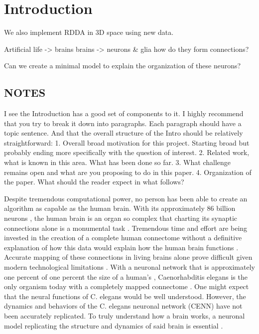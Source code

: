 \section{Introduction}

We also implement RDDA in 3D space using new data.

Artificial life -> brains
brains -> neurons \& glia 
how do they form connections?

Can we create a minimal model to explain the organization of these neurons?


\subsection{NOTES}
I see the Introduction has a good set of components to it. I highly recommend that you try to break it down into paragraphs. Each paragraph should have a topic sentence. And that the overall structure of the Intro should be relatively straightforward:
1. Overall broad motivation for this project. Starting broad but probably ending more specifically with the question of interest. 
2. Related work, what is known in this area. What has been done so far. 
3. What challenge remains open and what are you proposing to do in this paper. 
4. Organization of the paper. What should the reader expect in what follows? 

Despite tremendous computational power, no person has been able to create an algorithm as capable as the human brain. 
With its approximately 86 billion neurons \citep{Azevedo}, the human brain is an organ so complex that charting its synaptic connections alone is a monumental task \citep{VanEssen}. 
Tremendous time and effort are being invested in the creation of a complete human connectome without a definitive explanation of how this data would explain how the human brain functions \citep{Ceylan, Rheault}. 
Accurate mapping of these connections in living brains alone prove difficult given modern technological limitations \citep{Rheault}. 
With a neuronal network that is approximately one percent of one percent the size of a human’s \citep{Azevedo,White}, Caenorhabditis elegans is the only organism today with a completely mapped connectome \citep{White}. 
One might expect that the neural functions of C. elegans would be well understood. 
However, the dynamics and behaviors of the C. elegans neuronal network (CENN) have not been accurately replicated. 
To truly understand how a brain works, a neuronal model replicating the structure and dynamics of said brain is essential \citep{Izquierdo}.

